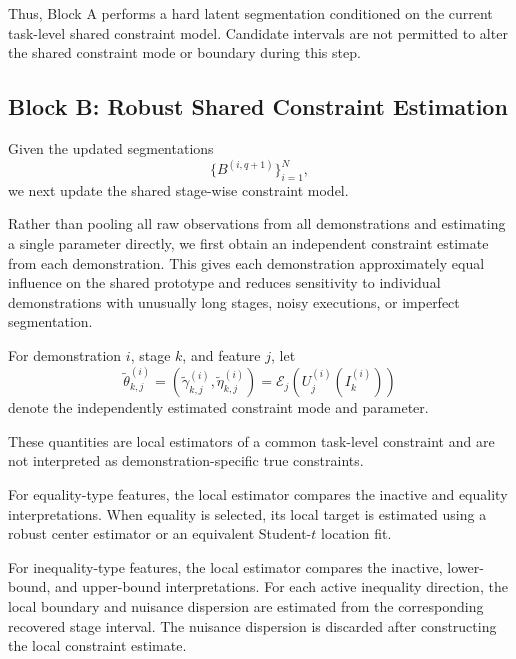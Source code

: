 \documentclass[lettersize,journal]{IEEEtran}
\begin{document}
Thus, Block A performs a hard latent segmentation conditioned on the current task-level shared constraint model. Candidate intervals are not permitted to alter the shared constraint mode or boundary during this step.

\subsection{Block B: Robust Shared Constraint Estimation}

Given the updated segmentations
\[
\{B^{(i,q+1)}\}_{i=1}^{N},
\]
we next update the shared stage-wise constraint model.

Rather than pooling all raw observations from all demonstrations and estimating a single parameter directly, we first obtain an independent constraint estimate from each demonstration. This gives each demonstration approximately equal influence on the shared prototype and reduces sensitivity to individual demonstrations with unusually long stages, noisy executions, or imperfect segmentation.

For demonstration $i$, stage $k$, and feature $j$, let
\[
\widetilde{\theta}_{k,j}^{(i)}
=
\left(
\widetilde{\gamma}_{k,j}^{(i)},
\widetilde{\eta}_{k,j}^{(i)}
\right)
=
\mathcal{E}_j
\left(
U_j^{(i)}(I_k^{(i)})
\right)
\]
denote the independently estimated constraint mode and parameter.

These quantities are local estimators of a common task-level constraint and are not interpreted as demonstration-specific true constraints.

For equality-type features, the local estimator compares the inactive and equality interpretations. When equality is selected, its local target is estimated using a robust center estimator or an equivalent Student-$t$ location fit.

For inequality-type features, the local estimator compares the inactive, lower-bound, and upper-bound interpretations. For each active inequality direction, the local boundary and nuisance dispersion are estimated from the corresponding recovered stage interval. The nuisance dispersion is discarded after constructing the local constraint estimate.

%
%
%
\end{document}
